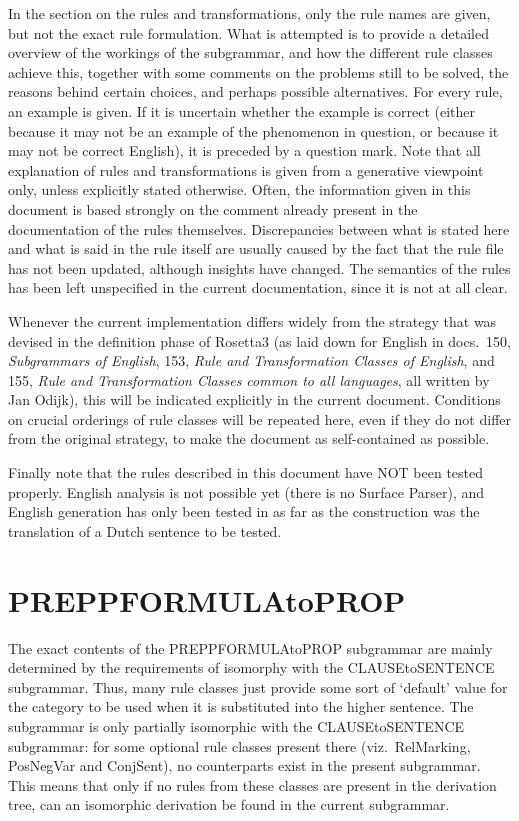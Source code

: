 In the section on the rules and transformations, only the rule names are given, 
but not the exact rule formulation. What is attempted 
is to provide a detailed overview of the workings of the subgrammar, and 
how the different rule classes achieve this,
together with some comments on the problems still to be solved, the reasons 
behind certain choices, and perhaps possible alternatives. For every rule, an 
example is given. If it is uncertain whether the example is correct (either 
because it may not be an example of the phenomenon in question, or because it 
may not be correct English), it is preceded by a question mark. Note that all 
explanation of rules and transformations is given from a generative viewpoint
only, unless explicitly stated otherwise. Often, the information given in this 
document is based strongly on the comment already present in the documentation 
of the rules themselves. Discrepancies between what is stated here and what is 
said in the rule itself are usually caused by the fact that the rule file has 
not  been updated, although insights have changed. The semantics of the rules 
has been left unspecified in the current documentation, since it is not at all 
clear.

Whenever the current implementation differs widely from the strategy that was 
devised in the definition phase of Rosetta3 (as laid down for English in docs.\ 
150, {\em Subgrammars of English\/}, 153, {\em Rule and Transformation Classes 
of English\/}, and 155, {\em Rule and Transformation Classes common to all 
languages\/}, all written by Jan Odijk), this will be indicated explicitly in 
the current document. Conditions on crucial orderings of rule classes will be 
repeated here, even if they do not differ from the original strategy, to make 
the document as self-contained as possible.

Finally note that the rules described in this document have NOT been tested 
properly. English analysis is not possible yet (there is no Surface Parser), and 
English generation has only been tested in as far as the construction was the 
translation of a Dutch sentence to be tested.

\newpage
\section{PREPPFORMULAtoPROP}
The exact contents of the PREPPFORMULAtoPROP subgrammar are mainly determined 
by the requirements of isomorphy with the CLAUSEtoSENTENCE subgrammar. Thus, 
many rule classes just provide some sort of 
`default' value for the category to be used when it is substituted into the 
higher sentence. The subgrammar is only partially isomorphic with the 
CLAUSEtoSENTENCE subgrammar: for some optional rule classes present there 
(viz.\ RelMarking, PosNegVar and ConjSent), no counterparts exist in the 
present subgrammar. This means that only if no rules from these classes are 
present in the derivation tree, can an isomorphic derivation be found in the 
current subgrammar.

